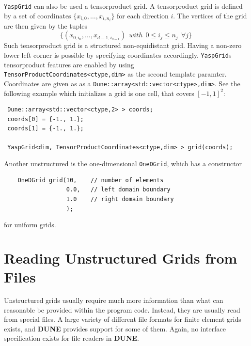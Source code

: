 \documentclass[11pt,a4paper,headinclude,footinclude,DIV16,headings=normal]{scrreprt}
\newcommand{\Dune}{{\sffamily\bfseries DUNE}\xspace}
\begin{document}
\lstinline!YaspGrid! can also be used a tensorproduct grid. A tensorproduct grid
is defined by a set of coordinates $\{ x_{i,0}, \dots ,x_{i,n_i}\}$ for each
direction $i$. The vertices of the grid are then given by the tuples
\begin{displaymath}
 \{
  (x_{0,i_0},\dots ,x_{d-1,i_{d-1}})\ \
   with\ \  0\leq i_j\leq n_j \ \ \forall j\}
\end{displaymath}
Such tensorproduct grid is a structured non-equidistant grid. Having a non-zero
lower left corner is possible by specifying coordinates accordingly. \lstinline!YaspGrid!s
tensorproduct features are enabled by using \lstinline!TensorProductCoordinates<ctype,dim>!
as the second template paramter. Coordinates are given as as a \lstinline!Dune::array<std::vector<ctype>,dim>!.
See the following example which initializes a grid is one cell, that covers $[-1,1]^2$:

\begin{lstlisting}
 Dune::array<std::vector<ctype,2> > coords;
 coords[0] = {-1., 1.};
 coords[1] = {-1., 1.};

 YaspGrid<dim, TensorProductCoordinates<ctype,dim> > grid(coords);
\end{lstlisting}

Another unstructured is the one-dimensional \lstinline!OneDGrid!, which has a constructor
\begin{lstlisting}
    OneDGrid grid(10,    // number of elements
                  0.0,   // left domain boundary
                  1.0    // right domain boundary
                  );
\end{lstlisting}
for uniform grids.

\section{Reading Unstructured Grids from Files}

Unstructured grids usually require much more information than what can
reasonable be provided within the program code.  Instead, they are usually
read from special files.  A large variety of different file formats for
finite element grids exists, and \Dune provides support for some of them.
Again, no interface specification exists for file readers in \Dune.
\end{document}
